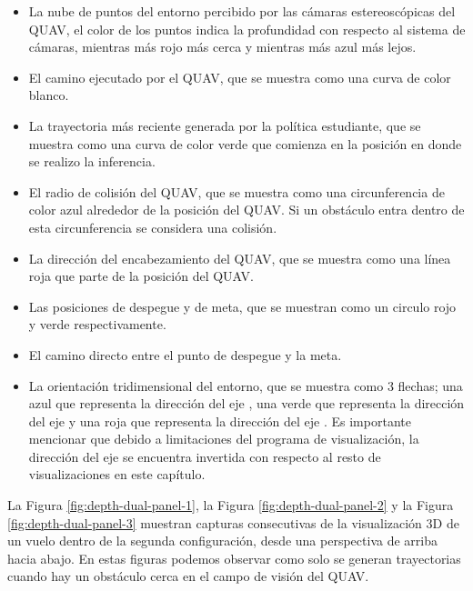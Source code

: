 \begin{itemize}
    \item La nube de puntos del entorno percibido por las cámaras estereoscópicas del QUAV, el color de los puntos indica la profundidad con respecto al sistema de cámaras, mientras más rojo más cerca y mientras más azul más lejos.
    \item El camino ejecutado por el QUAV, que se muestra como una curva de color blanco.
    \item La trayectoria más reciente generada por la política estudiante, que se muestra como una curva de color verde que comienza en la posición en donde se realizo la inferencia.
    \item El radio de colisión del QUAV, que se muestra como una circunferencia de color azul alrededor de la posición del QUAV. Si un obstáculo entra dentro de esta circunferencia se considera una colisión.
    \item La dirección del encabezamiento del QUAV, que se muestra como una línea roja que parte de la posición del QUAV.
    \item Las posiciones de despegue y de meta, que se muestran como un circulo rojo y verde respectivamente.
    \item El camino directo entre el punto de despegue y la meta.
    \item La orientación tridimensional del entorno, que se muestra como 3 flechas; una azul que representa la dirección del eje , una verde que representa la dirección del eje  y una roja que representa la dirección del eje . Es importante mencionar que debido a limitaciones del programa de visualización, la dirección del eje  se encuentra invertida con respecto al resto de visualizaciones en este capítulo.
\end{itemize}

La Figura \ref{fig:depth-dual-panel-1}, la Figura \ref{fig:depth-dual-panel-2} y la Figura \ref{fig:depth-dual-panel-3} muestran capturas consecutivas de la visualización 3D de un vuelo dentro de la segunda configuración, desde una perspectiva de arriba hacia abajo. En estas figuras podemos observar como solo se generan trayectorias cuando hay un obstáculo cerca en el campo de visión del QUAV.

